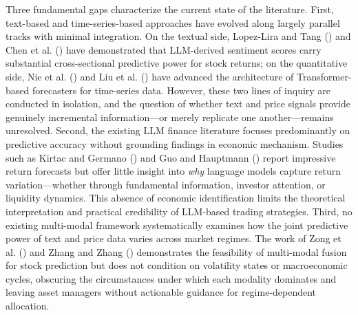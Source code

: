 \documentclass[
  11pt,
  a4paper,
]{article}
\begin{document}
Three fundamental gaps characterize the current state of the literature.
First, text-based and time-series-based approaches have evolved along
largely parallel tracks with minimal integration. On the textual side,
Lopez-Lira and Tang () and Chen et
al. () have demonstrated that
LLM-derived sentiment scores carry substantial cross-sectional
predictive power for stock returns; on the quantitative side, Nie et al.
() and Liu et al.
() have advanced the architecture of
Transformer-based forecasters for time-series data. However, these two
lines of inquiry are conducted in isolation, and the question of whether
text and price signals provide genuinely incremental information---or
merely replicate one another---remains unresolved. Second, the existing
LLM finance literature focuses predominantly on predictive accuracy
without grounding findings in economic mechanism. Studies such as Kirtac
and Germano () and Guo and
Hauptmann () report impressive return
forecasts but offer little insight into \emph{why} language models
capture return variation---whether through fundamental information,
investor attention, or liquidity dynamics. This absence of economic
identification limits the theoretical interpretation and practical
credibility of LLM-based trading strategies. Third, no existing
multi-modal framework systematically examines how the joint predictive
power of text and price data varies across market regimes. The work of
Zong et al. () and Zhang and Zhang
() demonstrates the feasibility of
multi-modal fusion for stock prediction but does not condition on
volatility states or macroeconomic cycles, obscuring the circumstances
under which each modality dominates and leaving asset managers without
actionable guidance for regime-dependent allocation.
\end{document}
